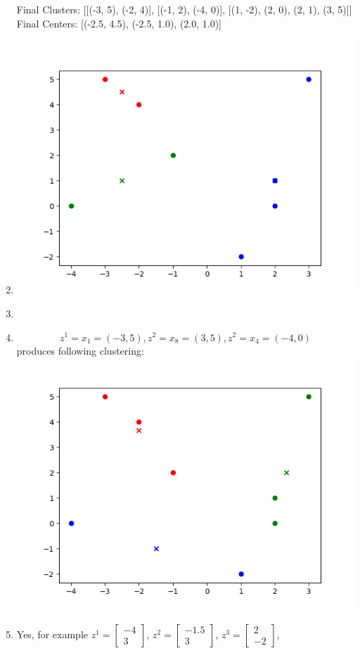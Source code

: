 \documentclass[12pt]{article}
\begin{document}
\begin{enumerate}[label=(\alph*)]
			Final Clusters: [[(-3, 5), (-2, 4)], [(-1, 2), (-4, 0)], [(1, -2), (2, 0), (2, 1), (3, 5)]] \\
			Final Centers: [(-2.5, 4.5), (-2.5, 1.0), (2.0, 1.0)]
	\item	\includegraphics{code/exercise_04_a.png}
	\item
	\item	\[z^1=x_1=(-3,5), z^2=x_8=(3,5), z^2=x_4=(-4,0)\]
			produces following clustering: \\
			\includegraphics{code/exercise_04_d.png}
	\item	Yes, for example
			$z^1=\begin{bmatrix} -4 \\ 3 \end{bmatrix}$,
			$z^2=\begin{bmatrix} -1.5 \\ 3 \end{bmatrix}$,
			$z^3=\begin{bmatrix} 2 \\ -2 \end{bmatrix}$,
\end{enumerate}
\end{document}
